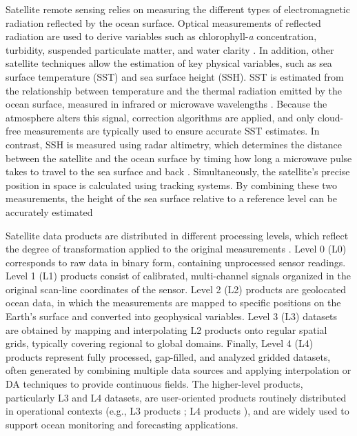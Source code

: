 Satellite remote sensing relies on measuring the different types of electromagnetic radiation reflected by the ocean surface. Optical measurements of reflected radiation are used to derive variables such as chlorophyll-\emph{a} concentration, turbidity, suspended particulate matter, and water clarity \parencite{topp2020research}. In addition, other satellite techniques allow the estimation of key physical variables, such as sea surface temperature (SST) and sea surface height (SSH). SST is estimated from the relationship between temperature and the thermal radiation emitted by the ocean surface, measured in infrared or microwave wavelengths \parencite{minnett2019half}. Because the atmosphere alters this signal, correction algorithms are applied, and only cloud-free measurements are typically used to ensure accurate SST estimates. In contrast, SSH is measured using radar altimetry, which determines the distance between the satellite and the ocean surface by timing how long a microwave pulse takes to travel to the sea surface and back \parencite{srinivasan2023satellite}. Simultaneously, the satellite's precise position in space is calculated using tracking systems. By combining these two measurements, the height of the sea surface relative to a reference level can be accurately estimated

Satellite data products are distributed in different processing levels, which reflect the degree of transformation applied to the original measurements \parencite{robinson2010methods}. Level 0 (L0) corresponds to raw data in binary form, containing unprocessed sensor readings. Level 1 (L1) products consist of calibrated, multi-channel signals organized in the original scan-line coordinates of the sensor. Level 2 (L2) products are geolocated ocean data, in which the measurements are mapped to specific positions on the Earth's surface and converted into geophysical variables. Level 3 (L3) datasets are obtained by mapping and interpolating L2 products onto regular spatial grids, typically covering regional to global domains. Finally, Level 4 (L4) products represent fully processed, gap-filled, and analyzed gridded datasets, often generated by combining multiple data sources and applying interpolation or DA techniques to provide continuous fields. The higher-level products, particularly L3 and L4 datasets, are user-oriented products routinely distributed in operational contexts (e.g., L3 products \parencite{eucmems2019slal3, eucmems2022sstl3}; L4 products \parencite{eucmems2019slal4, eucmems2019ho}), and are widely used to support ocean monitoring and forecasting applications.

